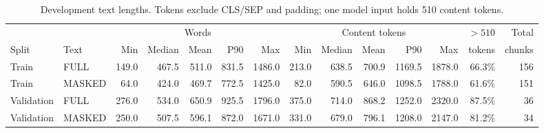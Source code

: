 \begin{table}[t]
\caption{Development text lengths. Tokens exclude CLS/SEP and padding; one model input holds 510 content tokens.}
\label{tab:length}
\centering\scriptsize
\begin{tabular}{llrrrrrrrrrrrr}
\toprule & & \multicolumn{5}{c}{Words} & \multicolumn{5}{c}{Content tokens} & $>510$ & Total \\
\cmidrule(lr){3-7}\cmidrule(lr){8-12}
Split & Text & Min & Median & Mean & P90 & Max & Min & Median & Mean & P90 & Max & tokens & chunks \\
\midrule
Train & FULL & 149.0 & 467.5 & 511.0 & 831.5 & 1486.0 & 213.0 & 638.5 & 700.9 & 1169.5 & 1878.0 & 66.3\% & 156 \\
Train & MASKED & 64.0 & 424.0 & 469.7 & 772.5 & 1425.0 & 82.0 & 590.5 & 646.0 & 1098.5 & 1788.0 & 61.6\% & 151 \\
Validation & FULL & 276.0 & 534.0 & 650.9 & 925.5 & 1796.0 & 375.0 & 714.0 & 868.2 & 1252.0 & 2320.0 & 87.5\% & 36 \\
Validation & MASKED & 250.0 & 507.5 & 596.1 & 872.0 & 1671.0 & 331.0 & 679.0 & 796.1 & 1208.0 & 2147.0 & 81.2\% & 34 \\
\bottomrule\end{tabular}
\end{table}